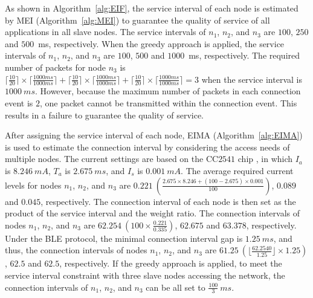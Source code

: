 \documentclass[10pt,journal,compsoc]{IEEEtran}
\begin{document}
As shown in Algorithm~\ref{alg:EIF}, the service interval of each node is estimated by MEI (Algorithm~\ref{alg:MEI}) to guarantee the quality of service of all applications in all slave nodes. The service intervals of $n_1$, $n_2$, and $n_3$ are $100$, $250$ and $500$~ms, respectively. When the greedy approach is applied, the service intervals of $n_1$, $n_2$, and $n_3$ are $100$, $500$ and $1000$~ms, respectively.
The required number of packets for node $n_3$ is $\lceil{\frac{10}{20}}\rceil \times \lceil{\frac{1000ms}{1000ms}}\rceil + \lceil{\frac{10}{20}}\rceil \times \lceil{\frac{1000ms}{1000ms}}\rceil + \lceil{\frac{10}{20}}\rceil \times \lceil{\frac{1000ms}{1000ms}}\rceil=3$ when the service interval is $1000~ms$.
However, because the maximum number of packets in each connection event is $2$, one packet cannot be transmitted within the connection event. This results in a failure to guarantee the quality of service.


After assigning the service interval of each node, EIMA (Algorithm~\ref{alg:EIMA}) is used to estimate the connection interval by considering the access needs of multiple nodes. The current settings are based on the CC$2541$ chip \cite{MEASURE_BLE}, in which $I_{a}$ is $8.246~mA$, $T_{a}$ is $2.675~ms$, and $I_s$ is $0.001~mA$.
The average required current levels for nodes $n_1$, $n_2$, and $n_3$ are $0.221\ (\frac{2.675 \times 8.246 + (100-2.675)\times 0.001}{100})$, $0.089$ and $0.045$, respectively. The connection interval of each node is then set as the product of the service interval and the weight ratio. The connection intervals of nodes $n_1$, $n_2$, and $n_3$ are $62.254\ (100 \times \frac{0.221}{0.335})$, $62.675$ and $63.378$, respectively. Under the BLE protocol, the minimal connection interval gap is $1.25~ms$, and thus, the connection intervals of nodes $n_1$, $n_2$, and $n_3$ are $61.25\ (\lfloor \frac{62.2540}{1.25} \rfloor \times 1.25)$, $62.5$ and $62.5$, respectively. If the greedy approach is applied, to meet the service interval constraint with three slave nodes accessing the network, the connection intervals of $n_1$, $n_2$, and $n_3$ can be all set to $\frac{100}{3}~ms$.
\end{document}
